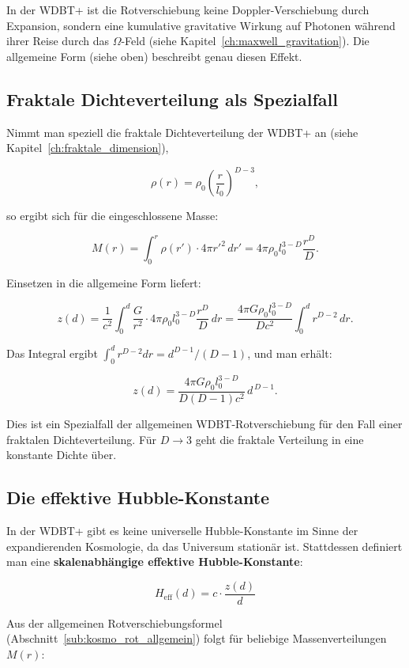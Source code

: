 In der WDBT+ ist die Rotverschiebung keine Doppler-Verschiebung durch Expansion, sondern eine kumulative gravitative Wirkung auf Photonen während ihrer Reise durch das \( \Omega \)-Feld (siehe Kapitel~\ref{ch:maxwell_gravitation}). Die allgemeine Form (siehe oben) beschreibt genau diesen Effekt.

\subsection{Fraktale Dichteverteilung als Spezialfall}
\label{sub:kosmo_rot_fraktal}

Nimmt man speziell die fraktale Dichteverteilung der WDBT+ an (siehe Kapitel~\ref{ch:fraktale_dimension}),

\[
\rho(r) = \rho_0 \left( \frac{r}{l_0} \right)^{D-3},
\]

so ergibt sich für die eingeschlossene Masse:

\[
M(r) = \int_0^r \rho(r') \cdot 4\pi r'^2 \, dr' = 4\pi \rho_0 l_0^{3-D} \frac{r^D}{D}.
\]

Einsetzen in die allgemeine Form liefert:

\[
z(d) = \frac{1}{c^2} \int_0^d \frac{G}{r^2} \cdot 4\pi \rho_0 l_0^{3-D} \frac{r^D}{D} \, dr
     = \frac{4\pi G \rho_0 l_0^{3-D}}{D c^2} \int_0^d r^{D-2} \, dr.
\]

Das Integral ergibt \( \int_0^d r^{D-2} dr = d^{D-1} / (D-1) \), und man erhält:

\[
z(d) = \frac{4\pi G \rho_0 l_0^{3-D}}{D(D-1) c^2} \, d^{\,D-1}.
\]

Dies ist ein Spezialfall der allgemeinen WDBT-Rotverschiebung für den Fall einer fraktalen Dichteverteilung. Für \( D \to 3 \) geht die fraktale Verteilung in eine konstante Dichte über.

\subsection{Die effektive Hubble-Konstante}
\label{sub:kosmo_effektive_hubble}

In der WDBT+ gibt es keine universelle Hubble-Konstante im Sinne der expandierenden Kosmologie, da das Universum stationär ist. Stattdessen definiert man eine \textbf{skalenabhängige effektive Hubble-Konstante}:

\[
H_{\text{eff}}(d) = c \cdot \frac{z(d)}{d}
\]

Aus der allgemeinen Rotverschiebungsformel (Abschnitt~\ref{sub:kosmo_rot_allgemein}) folgt für beliebige Massenverteilungen \( M(r) \):


